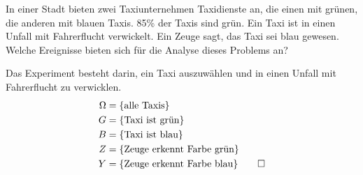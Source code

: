In einer Stadt bieten zwei Taxiunternehmen Taxidienste an, die einen mit
grünen, die anderen mit blauen Taxis. 85\% der Taxis sind grün.
Ein Taxi ist in einen Unfall mit Fahrerflucht verwickelt.
Ein Zeuge sagt, das Taxi sei blau gewesen.
Welche Ereignisse bieten sich für die Analyse dieses Problems an?

\begin{loesung}
Das Experiment besteht darin, ein Taxi auszuwählen und in einen Unfall
mit Fahrerflucht zu verwicklen.
\begin{align*}
\Omega&=\{\text{alle Taxis}\}\\
G&=\{\text{Taxi ist grün}\}\\
B&=\{\text{Taxi ist blau}\}\\
Z&=\{\text{Zeuge erkennt Farbe grün}\}\\
Y&=\{\text{Zeuge erkennt Farbe blau}\}
\qedhere
\end{align*}
\end{loesung}
